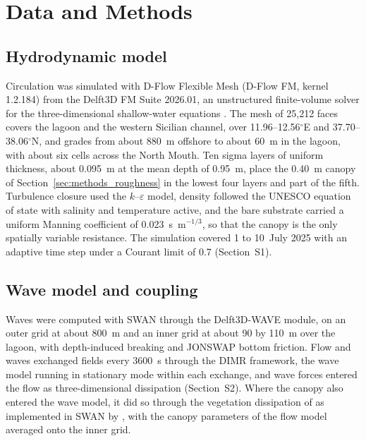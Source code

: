 \section{Data and Methods}
\label{sec:data_methods}

\subsection{Hydrodynamic model}
\label{sec:methods_model}

Circulation was simulated with D-Flow Flexible Mesh (D-Flow FM, kernel
1.2.184) from the Delft3D FM Suite 2026.01, an unstructured finite-volume
solver for the three-dimensional shallow-water equations \citep{Kernkamp2011}.
The mesh of 25{,}212 faces covers the lagoon and the western Sicilian channel,
over 11.96--12.56$^\circ$E and 37.70--38.06$^\circ$N, and grades from about
880~m offshore to about 60~m in the lagoon, with about six cells across the
North Mouth. Ten sigma layers of uniform thickness, about 0.095~m at the mean
depth of 0.95~m, place the 0.40~m canopy of Section~\ref{sec:methods_roughness}
in the lowest four layers and part of the fifth. Turbulence closure used the
$k$--$\varepsilon$ model, density followed the UNESCO equation of state with
salinity and temperature active, and the bare substrate carried a uniform
Manning coefficient of 0.023~s~m$^{-1/3}$, so that the canopy is the only
spatially variable resistance. The simulation covered 1 to 10~July 2025 with an
adaptive time step under a Courant limit of 0.7 (Section~S1).

\subsection{Wave model and coupling}
\label{sec:methods_waves}

Waves were computed with SWAN \citep{Booij1999} through the Delft3D-WAVE
module, on an outer grid at about 800~m and an inner grid at about 90 by 110~m
over the lagoon, with depth-induced breaking \citep{BattjesJanssen1978} and
JONSWAP bottom friction. Flow and waves exchanged fields every 3600~s through
the DIMR framework, the wave model running in stationary mode within each
exchange, and wave forces entered the flow as three-dimensional dissipation
(Section~S2). Where the canopy also entered the wave model, it did so through
the vegetation dissipation of \citet{Dalrymple1984} as implemented in SWAN by
\citet{Suzuki2012}, with the canopy parameters of the flow model averaged onto
the inner grid.

